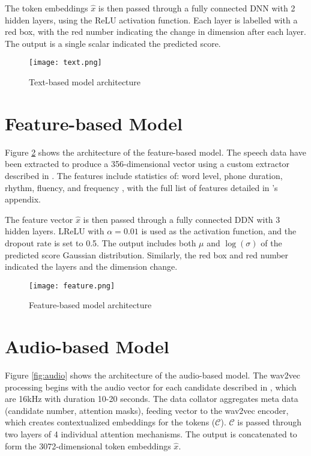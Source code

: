 The token embeddings $\hat{x}$ is then passed through a fully connected DNN with 2 hidden layers, using the ReLU activation function. Each layer is labelled with a red box, with the red number indicating the change in dimension after each layer. The output is a single scalar indicated the predicted score.

\begin{figure}[H]
    \centering
    \texttt{[image: text.png]}
    \caption{Text-based model architecture}
    \label{fig:text}
\end{figure}

\section{Feature-based Model}
Figure \ref{fig:feature} shows the architecture of the feature-based model. The speech data have been extracted to produce a 356-dimensional vector using a custom extractor described in \cite{feature}. The features include statistics of: word level, phone duration, rhythm, fluency, and frequency \cite{graders}, with the full list of features detailed in \cite{feature}'s appendix.

The feature vector $\hat{x}$ is then passed through a fully connected DDN with 3 hidden layers. LReLU with $\alpha = 0.01$ is used as the activation function, and the dropout rate is set to 0.5. The output includes both $\mu$ and $\log(\sigma)$ of the predicted score Gaussian distribution. Similarly, the red box and red number indicated the layers and the dimension change.

\begin{figure}[H]
    \centering
    \texttt{[image: feature.png]}
    \caption{Feature-based model architecture}
    \label{fig:feature}
\end{figure}

\section{Audio-based Model}
Figure \ref{fig:audio} shows the architecture of the audio-based model. The wav2vec processing begins with the audio vector for each candidate described in \cite{graders}, which are 16kHz with duration 10-20 seconds. The data collator aggregates meta data (candidate number, attention masks), feeding vector to the wav2vec encoder, which creates contextualized embeddings for the tokens ($\mathcal{C}$). $\mathcal{C}$ is passed through two layers of 4 individual attention mechanisms. The output is concatenated to form the 3072-dimensional  token embeddings $\hat{x}$.

